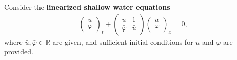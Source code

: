 \documentclass[12pt]{article}
\begin{document}
\clearpage
\begin{example}
	Consider the \textbf{linearized shallow water equations}
	\begin{align}
		\begin{pmatrix} u\\ \varphi\end{pmatrix}_{t}
		+
		\begin{pmatrix} \bar{u} & 1 \\ \bar{\varphi} & \bar{u} \end{pmatrix}
		\begin{pmatrix} u \\ \varphi\end{pmatrix}_{x}
		= 0,
	\end{align}
	where $\bar{u}, \bar{\varphi} \in \mathbb{R}$ are given, 
	and sufficient initial conditions for $u$ and $\varphi$ are provided.
\end{example}
\end{document}
